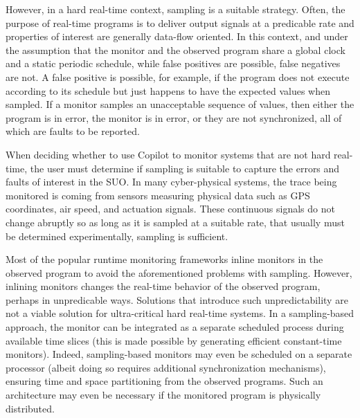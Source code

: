 However, in a hard real-time context, sampling is a suitable strategy.
%
 Often, the purpose of real-time programs is to deliver output signals at a
predicable rate and properties of interest are generally data-flow oriented.
%
 In this context, and under the assumption that the monitor and the observed
program share a global clock and a static periodic schedule, while false
positives are possible, false negatives are not.
%
 A false positive is possible, for example, if the program does not execute
according to its schedule but just happens to have the expected values when
sampled. 
%
 If a monitor samples an unacceptable sequence of values, then either the
program is in error, the monitor is in error, or they are not synchronized, all
of which are faults to be reported.
%

When deciding whether to use Copilot to monitor systems that are not hard
real-time, the user must determine if sampling is suitable to capture the
errors and faults of interest in the  SUO. In many cyber-physical systems, the
trace being monitored is coming from sensors measuring physical data such as
GPS coordinates, air speed, and actuation signals.
%
 These continuous signals do not change abruptly so as long as it is sampled at
a suitable rate, that usually must be determined experimentally, sampling is
sufficient.
%

Most of the popular runtime monitoring frameworks inline monitors in the
observed program to avoid the aforementioned problems with sampling.
%
 However, inlining monitors changes the real-time behavior of the observed
program, perhaps in unpredicable ways.
%
Solutions that introduce such unpredictability are not a viable solution for
ultra-critical hard real-time systems.
%
 In a sampling-based approach, the monitor can be integrated as a separate
scheduled process during available time slices (this is made possible by
generating efficient constant-time monitors).
%
 Indeed, sampling-based monitors may even be scheduled on a separate processor
(albeit doing so requires additional synchronization mechanisms), ensuring time
and space partitioning from the observed programs.
%
 Such an architecture may even be necessary if the monitored program is
physically distributed.




